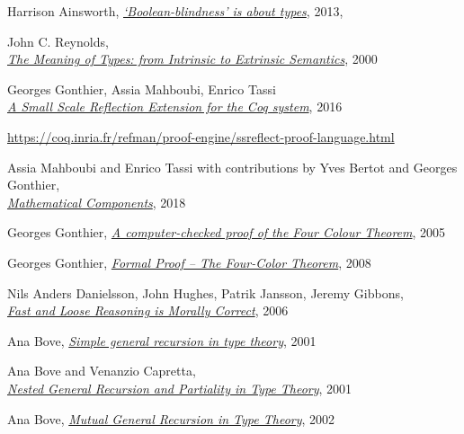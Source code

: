 \documentclass[declaration,mgr,english,shortabstract]{iithesis}
\begin{document}
\begin{thebibliography}{1}
    Harrison Ainsworth,
    \href{http://www.hxa.name/notes/note-hxa7241-20131124T0927Z.html}{\textit{‘Boolean-blindness’ is about types}},
    2013, \\

    John C. Reynolds, \\
    \href{https://www.cs.cmu.edu/afs/cs/user/jcr/ftp/typemeaning.pdf}{\textit{The Meaning of Types: from Intrinsic to Extrinsic Semantics}},
    2000

    Georges Gonthier, Assia Mahboubi, Enrico Tassi \\
    \href{https://hal.inria.fr/inria-00258384v17/document}{\textit{A Small Scale Reflection Extension for the Coq system}}, 2016

    \url{https://coq.inria.fr/refman/proof-engine/ssreflect-proof-language.html}
    
    Assia Mahboubi and Enrico Tassi with contributions by Yves Bertot and Georges Gonthier, \\
    \href{https://math-comp.github.io/mcb/}{\textit{Mathematical Components}}, 2018

    Georges Gonthier,
    \href{https://www.cl.cam.ac.uk/~lp15/Pages/4colproof.pdf}{\textit{A computer-checked proof of the Four Colour Theorem}}, 2005

    Georges Gonthier,
    \href{http://www.ams.org/notices/200811/tx081101382p.pdf}{\textit{Formal Proof -- The Four-Color Theorem}}, 2008

    Nils Anders Danielsson, John Hughes, Patrik Jansson, Jeremy Gibbons, \\
    \href{https://www.cs.ox.ac.uk/jeremy.gibbons/publications/fast+loose.pdf}{\textit{Fast and Loose Reasoning is Morally Correct}}, 2006

    Ana Bove,
    \href{https://dl.acm.org/doi/10.5555/774194.774197}{\textit{Simple general recursion in type theory}},
    2001

    Ana Bove and Venanzio Capretta, \\
    \href{https://www.researchgate.net/publication/285777618_Nested_General_Recursion_and_Partiality_in_Type_Theory}{\textit{Nested General Recursion and Partiality in Type Theory}},
    2001

    Ana Bove,
    \href{https://core.ac.uk/display/197949303}{\textit{Mutual General Recursion in Type Theory}},
    2002


\end{thebibliography}
\end{document}
